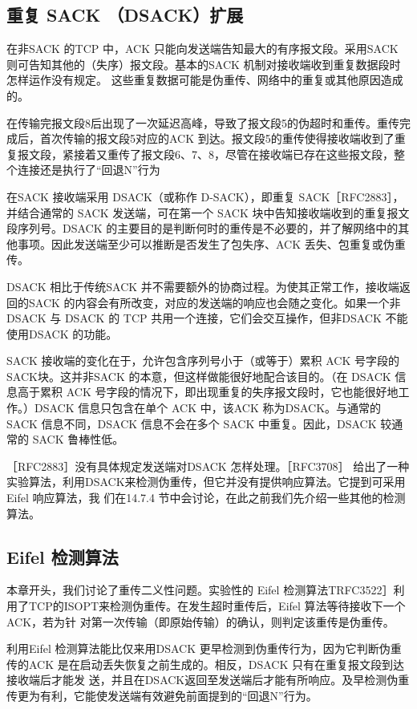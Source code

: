 \subsection{重复 SACK （DSACK）扩展}
在非SACK 的TCP 中，ACK 只能向发送端告知最大的有序报文段。采用SACK 则可告知其他的（失序）报文段。基本的SACK 机制对接收端收到重复数据段时怎样运作没有规定。
这些重复数据可能是伪重传、网络中的重复或其他原因造成的。

在传输完报文段8后出现了一次延迟高峰，导致了报文段5的伪超时和重传。重传完成后，首次传输的报文段5对应的ACK 到达。报文段5的重传使得接收端收到了重复报文段，紧接着又重传了报文段6、7、8，尽管在接收端已存在这些报文段，整个连接还是执行了“回退N”行为

在SACK 接收端采用 DSACK（或称作 D-SACK），即重复 SACK［RFC2883］，并结合通常的 SACK 发送端，可在第一个 SACK 块中告知接收端收到的重复报文段序列号。DSACK
的主要目的是判断何时的重传是不必要的，并了解网络中的其他事项。因此发送端至少可以推断是否发生了包失序、ACK 丢失、包重复或伪重传。

DSACK 相比于传统SACK 并不需要额外的协商过程。为使其正常工作，接收端返回的SACK 的内容会有所改变，对应的发送端的响应也会随之变化。如果一个非 DSACK 与
DSACK 的 TCP 共用一个连接，它们会交互操作，但非DSACK 不能使用DSACK 的功能。

SACK 接收端的变化在于，允许包含序列号小于（或等于）累积 ACK 号字段的SACK块。这并非SACK 的本意，但这样做能很好地配合该目的。（在 DSACK 信息高于累积 ACK
号字段的情况下，即出现重复的失序报文段时，它也能很好地工作。）DSACK 信息只包含在单个 ACK 中，该ACK 称为DSACK。与通常的SACK 信息不同，DSACK 信息不会在多个
SACK 中重复。因此，DSACK 较通常的 SACK 鲁棒性低。

［RFC2883］没有具体规定发送端对DSACK 怎样处理。［RFC3708］ 给出了一种实验算法，利用DSACK来检测伪重传，但它并没有提供响应算法。它提到可采用 Eifel 响应算法，我
们在14.7.4 节中会讨论，在此之前我们先介绍一些其他的检测算法。

\subsection{Eifel 检测算法}
本章开头，我们讨论了重传二义性问题。实验性的 Eifel 检测算法TRFC3522］利用了TCP的ISOPT来检测伪重传。在发生超时重传后，Eifel 算法等待接收下一个ACK，若为针
对第一次传输（即原始传输）的确认，则判定该重传是伪重传。

利用Eifel 检测算法能比仅来用DSACK 更早检测到伪重传行为，因为它判断伪重传的ACK 是在启动丢失恢复之前生成的。相反，DSACK 只有在重复报文段到达接收端后才能发
送，并且在DSACK返回至发送端后才能有所响应。及早检测伪重传更为有利，它能使发送端有效避免前面提到的“回退N”行为。

